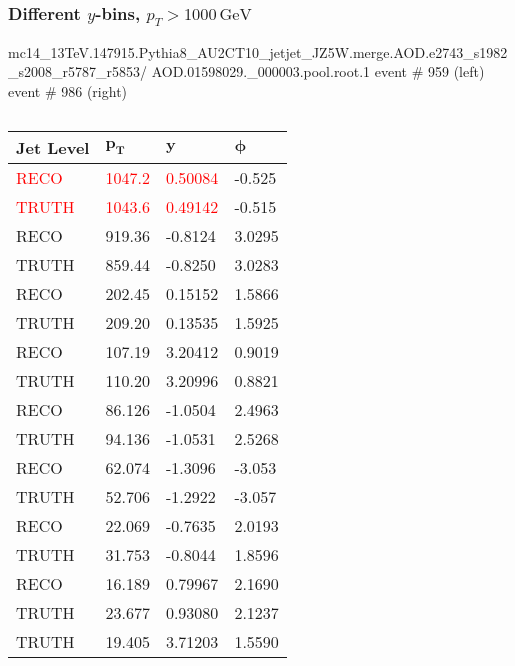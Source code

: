 \documentclass[compress]{beamer}
\begin{document}

\begin{frame}
\frametitle{Different $y$-bins, $p_T>1000\,\text{GeV}$}
\tiny
mc14\_13TeV.147915.Pythia8\_AU2CT10\_jetjet\_JZ5W.merge.AOD.e2743\_s1982\_s2008\_r5787\_r5853/
\quad   AOD.01598029.\_000003.pool.root.1  
\quad  event \# 959 (left)
\quad  event \# 986 (right)
\begin{columns}[onlytextwidth]
  \begin{column}{0.5\textwidth}
    \begin{table}
      \begin{tabular}{l l l l}
        \toprule
        \textbf{Jet Level} & $\mathbf{p_T}$ & $\mathbf{y}$ & $\mathbf{\phi}$ \\
        \midrule
        \textcolor{red}{RECO}   &  \textcolor{red}{1047.2} & \textcolor{red}{0.50084} &  -0.525  \\
        \textcolor{red}{TRUTH}  &  \textcolor{red}{1043.6} & \textcolor{red}{0.49142} &  -0.515  \\
        \midrule
        RECO   &  919.36 &  -0.8124 &  3.0295  \\
        TRUTH  &  859.44 &  -0.8250 &  3.0283  \\
        \midrule
        RECO   &  202.45 &  0.15152 &  1.5866  \\
        TRUTH  &  209.20 &  0.13535 &  1.5925  \\
        \midrule
        RECO   &  107.19 &  3.20412 &  0.9019  \\
        TRUTH  &  110.20 &  3.20996 &  0.8821  \\
        \midrule
        RECO   &  86.126 &  -1.0504 &  2.4963  \\
        TRUTH  &  94.136 &  -1.0531 &  2.5268  \\
        \midrule
        RECO   &  62.074 &  -1.3096 &  -3.053  \\
        TRUTH  &  52.706 &  -1.2922 &  -3.057  \\
        \midrule
        RECO   &  22.069 &  -0.7635 &  2.0193  \\
        TRUTH  &  31.753 &  -0.8044 &  1.8596  \\
        \midrule
        RECO   &  16.189 &  0.79967 &  2.1690  \\
        TRUTH  &  23.677 &  0.93080 &  2.1237  \\
        \midrule
        \midrule
        TRUTH  &  19.405 &  3.71203 &  1.5590  \\

\end{tabular}
\end{table}
\end{column}
\end{columns}
\end{frame}
\end{document}
